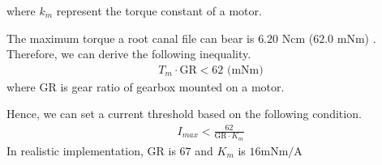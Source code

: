 where $k_m$ represent the torque constant of a motor.
\par\noindent
The maximum torque a root canal file can bear is $6.20$ Ncm ($62.0$ mNm) \cite{boessler2009effect}. Therefore, we can derive the following inequality.
\begin{equation}
\begin{split}
T_m \cdot \mathrm{GR} < 62 \text{ (mNm)}
\end{split}
\end{equation}
where $\mathrm{GR}$ is gear ratio of gearbox mounted on a motor.
\par
Hence, we can set a current threshold based on the following condition. 
\begin{equation}
\begin{split}
I_{max} < \frac{62}{\mathrm{GR} \cdot K_m}
\end{split}
\end{equation} 
In realistic implementation, $\mathrm{GR}$ is $67$ and $K_m$ is $16 \text{mNm/A}$
